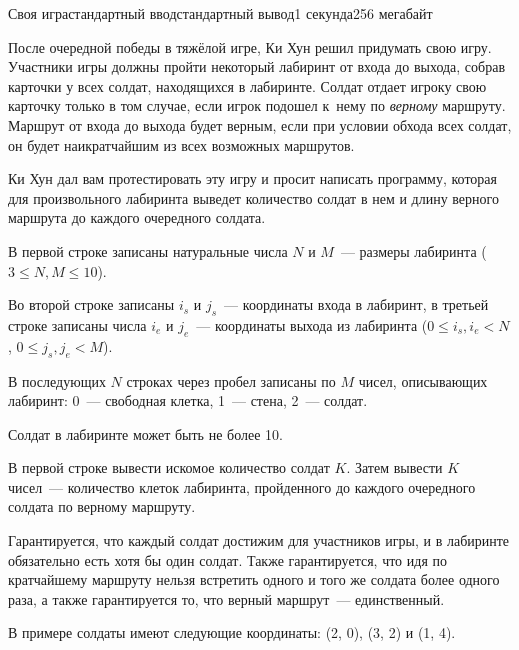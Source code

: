 \begin{problem}{Своя игра}{стандартный ввод}{стандартный вывод}{1 секунда}{256 мегабайт}

После очередной победы в тяжёлой игре, Ки Хун решил придумать свою игру. Участники игры должны пройти некоторый лабиринт от входа до выхода, собрав карточки у всех солдат, находящихся в лабиринте. Солдат отдает игроку свою карточку только в том случае, если игрок подошел к~нему по \textit{верному} маршруту. Маршрут от входа до выхода будет верным, если при условии обхода всех солдат, он будет наикратчайшим из всех возможных маршрутов. 

Ки Хун дал вам протестировать эту игру и просит написать программу, которая для произвольного лабиринта выведет количество солдат в нем и длину верного маршрута до каждого очередного солдата.

\InputFile
В первой строке записаны натуральные числа $N$ и $M$~--- размеры лабиринта ($3 \leq N, M \leq 10$).

Во второй строке записаны $i_s$ и $j_s$~--- координаты входа в лабиринт, в третьей строке записаны числа $i_e$ и $j_e$~--- координаты выхода из лабиринта ($0 \leq i_s, i_e < N$, $0 \leq j_s, j_e < M$). 

В последующих $N$ строках через пробел записаны по $M$ чисел, описывающих лабиринт: 0~--- свободная клетка, 1~--- стена, 2~--- солдат. 

Солдат в лабиринте может быть не более 10.

\OutputFile
В первой строке вывести искомое количество солдат $K$. Затем вывести $K$ чисел~--- количество клеток лабиринта, пройденного до каждого очередного солдата по верному маршруту.

\Example

\begin{example}
%
\end{example}

\Note
Гарантируется, что каждый солдат достижим для участников игры, и в лабиринте обязательно есть хотя бы один солдат. Также гарантируется, что идя по кратчайшему маршруту нельзя встретить одного и того же солдата более одного раза, а также гарантируется то, что верный маршрут~--- единственный.

В примере солдаты имеют следующие координаты: (2, 0), (3, 2) и (1, 4).

\end{problem}

